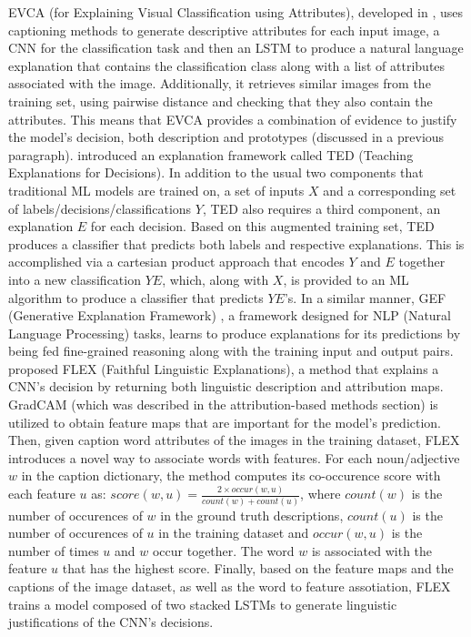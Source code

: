 \documentclass[journal]{IEEEtran}
\begin{document}
EVCA (for Explaining Visual Classification using Attributes), developed in \cite{UlHassan2019}, uses captioning methods to generate descriptive attributes for each input image, a CNN for the classification task and then an LSTM to produce a natural language explanation that contains the classification class along with a list of attributes associated with the image. Additionally, it retrieves similar images from the training set, using pairwise distance and checking that they also contain the attributes. This means that EVCA provides a combination of evidence to justify the model's decision, both description and prototypes (discussed in a previous paragraph). 
\cite{Hind2019} introduced an explanation framework called TED (Teaching Explanations for Decisions). In addition to the usual two components that traditional ML models are trained on, a set of inputs $X$ and a corresponding set of labels/decisions/classifications $Y$, TED also requires a third component, an explanation $E$ for each decision. Based on this augmented training set, TED produces a classifier that predicts both labels and respective explanations. This is accomplished via a cartesian product approach that encodes $Y$ and $E$ together into a new classification $YE$, which, along with $X$, is provided to an ML algorithm to produce a classifier that predicts $YE$'s.
In a similar manner, GEF (Generative Explanation Framework) \cite{Liu2020}, a framework designed for NLP (Natural Language Processing) tasks, learns to produce explanations for its predictions by being fed fine-grained reasoning along with the training input and output pairs.
\cite{Wickramanayake2019} proposed FLEX (Faithful Linguistic Explanations), a method that explains a CNN's decision by returning both linguistic description and attribution maps. GradCAM (which was described in the attribution-based methods section) is utilized to obtain feature maps that are important for the model's prediction. Then, given caption word attributes of the images in the training dataset, FLEX introduces a novel way to associate words with features. For each noun/adjective $w$ in the caption dictionary, the method computes its co-occurence score with each feature $u$ as: $score(w,u)=\frac{2 \times occur(w,u)}{count(w)+count(u)}$, where $count(w)$ is the number of occurences of $w$ in the ground truth descriptions, $count(u)$ is the number of occurences of $u$ in the training dataset and $occur(w,u)$ is the number of times $u$ and $w$ occur together. The word $w$ is associated with the feature $u$ that has the highest score. Finally, based on the feature maps and the captions of the image dataset, as well as the word to feature assotiation, FLEX trains a model composed of two stacked LSTMs to generate linguistic justifications of the CNN's decisions.
\end{document}

